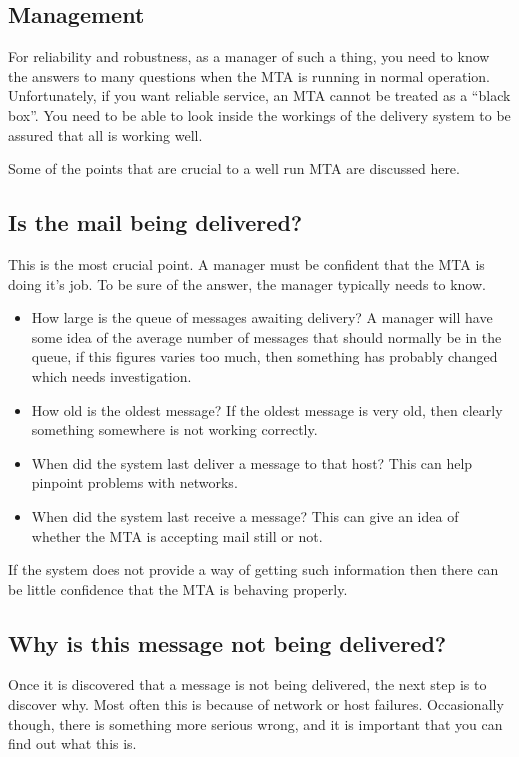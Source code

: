 \subsection{Management}

For reliability and robustness, as a manager of such a thing, you need
to know the answers to many questions when the MTA is running in
normal operation. Unfortunately, if you want reliable service, an MTA
cannot be treated as a ``black box''. You need to be able to look
inside the workings of the delivery system to be assured that all is
working well.

Some of the points that are crucial to a well run MTA are discussed here.

\subsection{Is the mail being delivered?}
This is the most crucial point. A manager must be confident that the
MTA is doing it's job. To be sure of the answer, the manager typically
needs to know.
\begin{itemize}
\item	How large is the queue of messages awaiting delivery? A
manager will have some idea of the average number of messages that
should normally be in the queue, if this figures varies too much, then
something has probably changed which needs investigation.
\item	How old is the oldest message?
If the oldest message is very old, then clearly something somewhere is
not working correctly.
\item	When did the system last deliver a message to that host? This
can help pinpoint problems with networks.
\item	When did the system last receive a message? This can give an
idea of whether the MTA is accepting mail still or not.
\end{itemize}
If the system does not provide a way of getting such information then
there can be little confidence that the MTA is behaving properly.

\subsection{Why is this message not being delivered?}
Once it is discovered that a message is not being delivered, the next
step is to discover why. Most often this is because of network or host
failures. Occasionally though, there is something more serious wrong,
and it is important that you can find out what this is.

